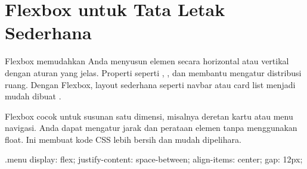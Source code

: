 \section{Flexbox untuk Tata Letak Sederhana}
Flexbox memudahkan Anda menyusun elemen secara horizontal atau vertikal dengan aturan yang jelas. Properti seperti , , dan  membantu mengatur distribusi ruang. Dengan Flexbox, layout sederhana seperti navbar atau card list menjadi mudah dibuat \cite{mdnCss}.

Flexbox cocok untuk susunan satu dimensi, misalnya deretan kartu atau menu navigasi. Anda dapat mengatur jarak dan perataan elemen tanpa menggunakan float. Ini membuat kode CSS lebih bersih dan mudah dipelihara.

\begin{webcode}[language=CSS, caption={Contoh Flexbox Sederhana}]
.menu {
  display: flex;
  justify-content: space-between;
  align-items: center;
  gap: 12px;
}
\end{webcode}

